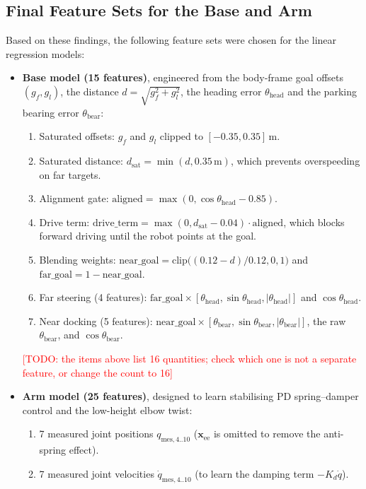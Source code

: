 \documentclass[conference]{IEEEtran}
\newcommand{\todo}[1]{\textcolor{red}{[TODO: #1]}}
\begin{document}
\subsection{Final Feature Sets for the Base and Arm}
\label{sec:features}
Based on these findings, the following feature sets were chosen for the linear regression models:
\begin{itemize}
    \item \textbf{Base model (15 features)}, engineered from the body-frame goal offsets $(g_f, g_l)$, the distance $d = \sqrt{g_f^2 + g_l^2}$, the heading error $\theta_{\text{head}}$ and the parking bearing error $\theta_{\text{bear}}$:
    \begin{enumerate}
        \item Saturated offsets: $g_f$ and $g_l$ clipped to $[-0.35, 0.35]\,\text{m}$.
        \item Saturated distance: $d_{\text{sat}} = \min(d, 0.35\,\text{m})$, which prevents overspeeding on far targets.
        \item Alignment gate: $\text{aligned} = \max(0, \cos\theta_{\text{head}} - 0.85)$.
        \item Drive term: $\text{drive\_term} = \max(0, d_{\text{sat}} - 0.04) \cdot \text{aligned}$, which blocks forward driving until the robot points at the goal.
        \item Blending weights: $\text{near\_goal} = \text{clip}\bigl((0.12 - d)/0.12, 0, 1\bigr)$ and $\text{far\_goal} = 1 - \text{near\_goal}$.
        \item Far steering (4 features): $\text{far\_goal} \times [\theta_{\text{head}}, \sin\theta_{\text{head}}, |\theta_{\text{head}}|]$ and $\cos\theta_{\text{head}}$.
        \item Near docking (5 features): $\text{near\_goal} \times [\theta_{\text{bear}}, \sin\theta_{\text{bear}}, |\theta_{\text{bear}}|]$, the raw $\theta_{\text{bear}}$, and $\cos\theta_{\text{bear}}$.
    \end{enumerate}
    \todo{the items above list 16 quantities; check which one is not a separate feature, or change the count to 16}
    \item \textbf{Arm model (25 features)}, designed to learn stabilising PD spring--damper control and the low-height elbow twist:
    \begin{enumerate}
        \item 7 measured joint positions $q_{\text{mes},4..10}$ ($\mathbf{x}_{\text{ee}}$ is omitted to remove the anti-spring effect).
        \item 7 measured joint velocities $\dot{q}_{\text{mes},4..10}$ (to learn the damping term $-K_d \dot{q}$).

\end{enumerate}
\end{itemize}
\end{document}
